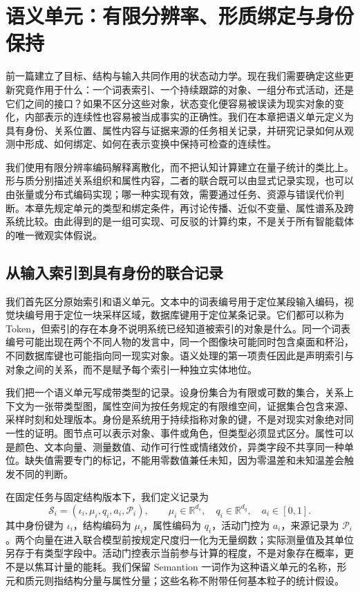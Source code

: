 \chapter{语义单元：有限分辨率、形质绑定与身份保持}
\label{chp:quantization_reality}

前一篇建立了目标、结构与输入共同作用的状态动力学。现在我们需要确定这些更新究竟作用于什么：一个词表索引、一个持续跟踪的对象、一组分布式活动，还是它们之间的接口？如果不区分这些对象，状态变化便容易被误读为现实对象的变化，内部表示的连续性也容易被当成事实的正确性。我们在本章把语义单元定义为具有身份、关系位置、属性内容与证据来源的任务相关记录，并研究记录如何从观测中形成、如何绑定、如何在表示变换中保持可检查的连续性。

我们使用有限分辨率编码解释离散化，而不把认知计算建立在量子统计的类比上。形与质分别描述关系组织和属性内容，二者的联合既可以由显式记录实现，也可以由张量或分布式编码实现；哪一种实现有效，需要通过任务、资源与错误代价判断。本章先规定单元的类型和绑定条件，再讨论传播、近似不变量、属性谱系及跨系统比较。由此得到的是一组可实现、可反驳的计算约束，不是关于所有智能载体的唯一微观实体假说。

\section{从输入索引到具有身份的联合记录}
\label{sec:section_3160}

我们首先区分原始索引和语义单元。文本中的词表编号用于定位某段输入编码，视觉块编号用于定位一块采样区域，数据库键用于定位某条记录。它们都可以称为 Token，但索引的存在本身不说明系统已经知道被索引的对象是什么。同一个词表编号可能出现在两个不同人物的发言中，同一个图像块可能同时包含桌面和杯沿，不同数据库键也可能指向同一现实对象。语义处理的第一项责任因此是声明索引与对象之间的关系，而不是赋予每个索引一种独立实体地位。

我们把一个语义单元写成带类型的记录。设身份集合为有限或可数的集合，关系上下文为一张带类型图，属性空间为按任务规定的有限维空间，证据集合包含来源、采样时刻和处理版本。身份是系统用于持续指称对象的键，不是对现实对象绝对同一性的证明。图节点可以表示对象、事件或角色，但类型必须显式区分。属性可以是颜色、文本向量、测量数值、动作可行性或情绪效价，异类字段不共享同一种单位。缺失值需要专门的标记，不能用零数值兼任未知，因为零温差和未知温差会触发不同的判断。

在固定任务与固定结构版本下，我们定义记录为
\[
 \mathcal S_i=(\iota_i,\mu_i,q_i,a_i,\mathcal P_i),\qquad
 \mu_i\in\mathbb R^{d_s},\quad q_i\in\mathbb R^{d_q},\quad a_i\in[0,1].
\]
其中身份键为 $\iota_i$，结构编码为 $\mu_i$，属性编码为 $q_i$，活动门控为 $a_i$，来源记录为 $\mathcal P_i$。两个向量在进入联合模型前按规定尺度归一化为无量纲数；实际测量值及其单位另存于有类型字段中。活动门控表示当前参与计算的程度，不是对象存在概率，更不是以焦耳计量的能耗。我们保留 Semantion 一词作为这种语义单元的名称，形元和质元则指结构分量与属性分量；这些名称不附带任何基本粒子的统计假设。

